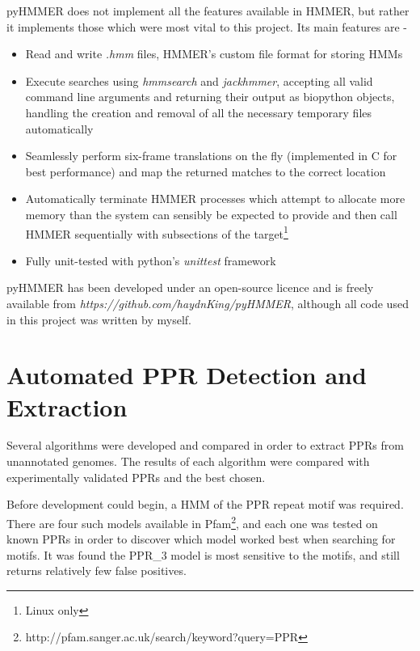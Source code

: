 pyHMMER does not implement all the features available in HMMER, but rather it
implements those which were most vital to this project.
Its main features are -
\begin{itemize}
  \item Read and write \emph{.hmm} files, HMMER's custom file format for
    storing HMMs
  \item Execute searches using 
    \emph{hmmsearch} and \emph{jackhmmer}, accepting all valid command line
    arguments and returning their output as biopython objects, 
    handling the creation and removal of all the necessary 
    temporary files automatically
  \item Seamlessly perform six-frame translations on the fly (implemented in C
    for best performance)
    and map the returned matches to the correct location
  \item Automatically terminate HMMER processes which attempt to allocate more
    memory than the system can sensibly be expected to provide and then call
    HMMER sequentially with subsections of the target\footnote{Linux only}
  \item Fully unit-tested with python's \emph{unittest} framework
\end{itemize}
pyHMMER has been developed under an open-source licence and is freely available
from \emph{https://github.com/haydnKing/pyHMMER}, although all code used in
this project was written by myself.


\section{Automated PPR Detection and Extraction}
\label{sec:ppr_extraction}

Several algorithms were developed and compared in order to extract PPRs from
unannotated genomes.
The results of each algorithm were compared with experimentally validated PPRs
and the best chosen.

Before development could begin, a HMM of the PPR repeat motif was required.
There are four such models available in
Pfam\footnote{http://pfam.sanger.ac.uk/search/keyword?query=PPR}, and each one
was tested on known PPRs in order to discover which model worked best when
searching for motifs.
It was found the PPR\_3 model is most sensitive to the motifs, and still
returns relatively few false positives.

